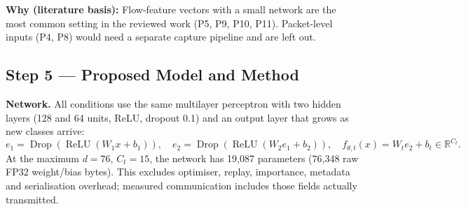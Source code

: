 \documentclass[10pt,a4paper]{article}
\newcommand{\why}[1]{\par\nopagebreak[4]\noindent\colorbox{black!5}{\parbox{\dimexpr\linewidth-2\fboxsep}{\small\textbf{Why (literature basis):} #1}}\par}
\begin{document}
\why{Flow-feature vectors with a small network are the most common setting in the reviewed work (P5, P9, P10, P11). Packet-level inputs (P4, P8) would need a separate capture pipeline and are left out.}

\subsection{Step 5 --- Proposed Model and Method}
\textbf{Network.} All conditions use the same multilayer perceptron with two hidden layers (128 and 64 units, ReLU, dropout 0.1) and an output layer that grows as new classes arrive:
\begin{equation}
e_1=\operatorname{Drop}(\operatorname{ReLU}(W_1x+b_1)),\quad
e_2=\operatorname{Drop}(\operatorname{ReLU}(W_2e_1+b_2)),\quad
f_{\theta,t}(x)=W_te_2+b_t\in\mathbb R^{C_t}.
\label{eq:head}
\end{equation}
At the maximum $d=76$, $C_t=15$, the network has 19,087 parameters (76,348 raw FP32 weight/bias bytes). This excludes optimiser, replay, importance, metadata and serialisation overhead; measured communication includes those fields actually transmitted.
\end{document}
